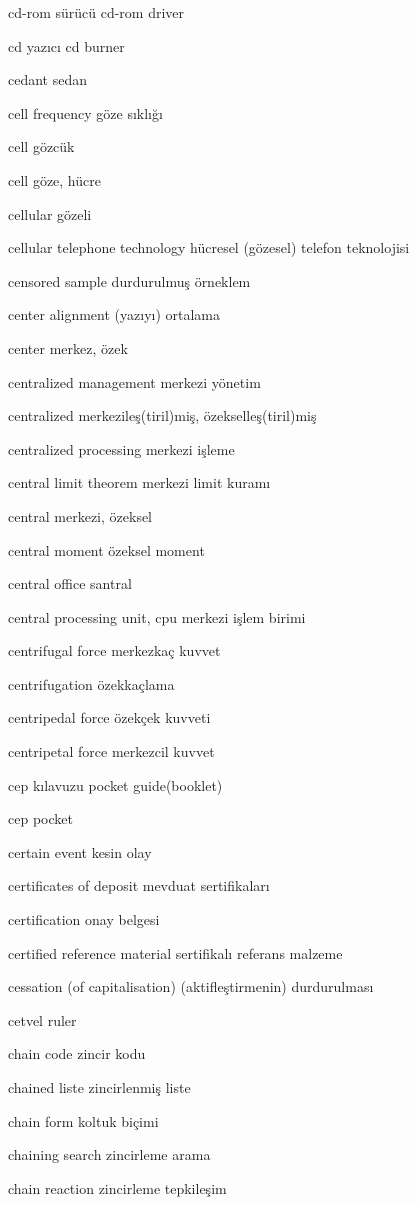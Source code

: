 \documentclass[12pt,fleqn]{article}\usepackage{../../common}
\begin{document}
cd-rom sürücü cd-rom driver

cd yazıcı cd burner

cedant sedan

cell frequency göze sıklığı

cell gözcük

cell göze, hücre

cellular gözeli

cellular telephone technology hücresel (gözesel) telefon teknolojisi

censored sample durdurulmuş örneklem

center alignment (yazıyı) ortalama

center merkez, özek

centralized management merkezi yönetim

centralized merkezileş(tiril)miş, özekselleş(tiril)miş

centralized processing merkezi işleme

central limit theorem merkezi limit kuramı

central merkezi, özeksel

central moment özeksel moment

central office santral

central processing unit, cpu merkezi işlem birimi

centrifugal force merkezkaç kuvvet

centrifugation özekkaçlama

centripedal force özekçek kuvveti

centripetal force merkezcil kuvvet

cep kılavuzu pocket guide(booklet)

cep pocket

certain event kesin olay

certificates of deposit mevduat sertifikaları

certification onay belgesi

certified reference material sertifikalı referans malzeme

cessation (of capitalisation) (aktifleştirmenin) durdurulması

cetvel ruler

chain code zincir kodu

chained liste zincirlenmiş liste

chain form koltuk biçimi

chaining search zincirleme arama

chain reaction zincirleme tepkileşim
\end{document}
